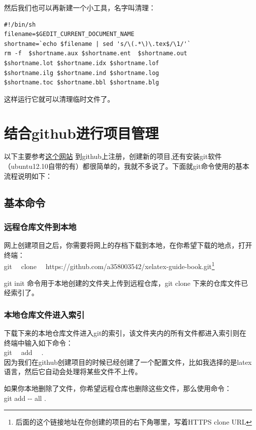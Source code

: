 \documentclass[11pt,oneside]{book}
\begin{document}
\begin{common-format}
然后我们也可以再新建一个小工具，名字叫清理：
\begin{Verbatim}
#!/bin/sh
filename=$GEDIT_CURRENT_DOCUMENT_NAME
shortname=`echo $filename | sed 's/\(.*\)\.tex$/\1/'`
rm -f  $shortname.aux $shortname.ent  $shortname.out 
$shortname.lot $shortname.idx $shortname.lof 
$shortname.ilg $shortname.ind $shortname.log 
$shortname.toc $shortname.bbl $shortname.blg
\end{Verbatim}
这样运行它就可以清理临时文件了。


\section{结合github进行项目管理}
以下主要参考\href{http://rogerdudler.github.io/git-guide/index.zh.html}{这个网站}
到github上注册，创建新的项目,还有安装git软件（ubuntu12.10自带的有）都很简单的，我就不多说了。下面就git命令使用的基本流程说明如下：
\subsection{基本命令}
\subsubsection{远程仓库文件到本地}
网上创建项目之后，你需要将网上的存档下载到本地，在你希望下载的地点，打开终端：\\
git ~~clone ~~https://github.com/a358003542/xelatex-guide-book.git\footnote{后面的这个链接地址在你创建的项目的右下角哪里，写着HTTPS clone URL}

git init 命令用于本地创建的文件夹上传到远程仓库，git clone 下来的仓库文件已经索引了。

\subsubsection{本地仓库文件进入索引}
下载下来的本地仓库文件进入git的索引，该文件夹内的所有文件都进入索引则在终端中输入如下命令：\\
git ~~add ~~.  \\
因为我们在github创建项目的时候已经创建了一个配置文件，比如我选择的是latex语言，然后它自动会处理将某些文件不上传。

如果你本地删除了文件，你希望远程仓库也删除这些文件，那么使用命令：\\
git  add  -{}- all   .  



\end{common-format}
\end{document}
